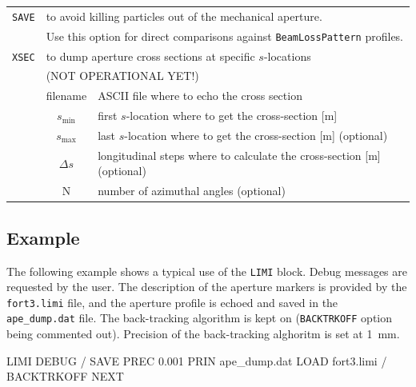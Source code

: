 \begin{center}
\begin{longtable}{|c|c|l|}
    \texttt{SAVE}  & \multicolumn{2}{l|}{to avoid killing particles out of the mechanical aperture.} \\*
                   & \multicolumn{2}{l|}{Use this option for direct comparisons against \texttt{BeamLossPattern} profiles.} \\*
    \hline

    \texttt{XSEC}  & \multicolumn{2}{l|}{to dump aperture cross sections at specific $s$-locations} \\*
                   & \multicolumn{2}{l|}{(NOT OPERATIONAL YET!)} \\*
                   & filename & ASCII file where to echo the cross section \\*
                   & $s_{\textrm{min}}$ & first $s$-location where to get the cross-section [m] \\*
                   & $s_{\textrm{max}}$ & last $s$-location where to get the cross-section [m] (optional) \\*
                   & $\Delta s$ & longitudinal steps where to calculate the cross-section [m] (optional) \\*
                   & N & number of azimuthal angles (optional) \\*
    \hline

\end{longtable}
\end{center}

\subsection{Example}
The following example shows a typical use of the \texttt{LIMI} block. Debug messages are requested by the user. The description of the aperture markers is provided by the \texttt{fort3.limi} file, and the aperture profile is echoed and saved in the \texttt{ape\_dump.dat} file. The back-tracking algorithm is kept on (\texttt{BACKTRKOFF} option being commented out). Precision of the back-tracking alghoritm is set at 1~mm.
\begin{cverbatim}
LIMI
DEBUG
/ SAVE
PREC        0.001
PRIN  ape_dump.dat
LOAD  fort3.limi
/ BACKTRKOFF
NEXT
\end{cverbatim}

